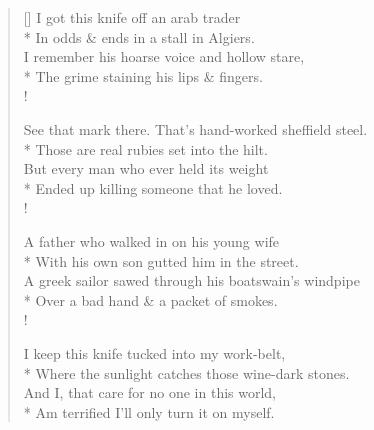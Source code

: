 \settowidth{\versewidth}{Where the sunlight catches those wine-dark stones.}
\begin{verse}[\versewidth]
I got this knife off an arab trader\\*
In odds \& ends in a stall in {\sc Algiers}.\\
I remember his hoarse voice and hollow stare,\\*
The grime staining his lips \& fingers.\\!

See that mark there. That's hand-worked sheffield steel.\\*
Those are real rubies set into the hilt.\\
But every man who ever held its weight\\*
Ended up killing someone that he loved.\\!

A father who walked in on his young wife\\*
With his own son gutted him in the street.\\
A greek sailor sawed through his boatswain's windpipe\\*
Over a bad hand \& a packet of smokes.\\!

I keep this knife tucked into my work-belt,\\*
Where the sunlight catches those wine-dark stones.\\
And I, that care for no one in this world,\\*
Am terrified I'll only turn it on myself.
\end{verse}
